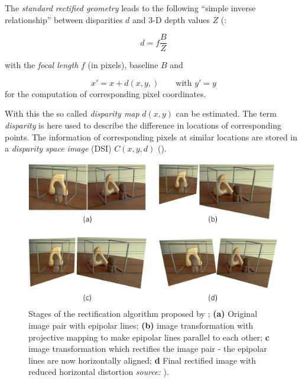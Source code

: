 The \textit{standard rectified geometry} leads to the following \enquote{simple inverse relationship} between disparities $d$ and 3-D depth values $Z$ (\cite[p.473]{Szeliski.2011}:

\begin{equation}
 d = f \frac{B}{Z} \label{eq:disparity}
\end{equation}

with the \textit{focal length} $f$ (in pixels), baseline $B$ and 

\begin{equation}
 x'=x+d(x,y,) 
 \qquad
 \text{with }
 y'=y
\end{equation}
for the computation of corresponding pixel coordinates.

With this the so called \textit{disparity map} $d(x,y)$ can be estimated. The term \textit{disparity} is here used to describe the difference in locations of corresponding points. The information of corresponding pixels at similar locations are stored in a \textit{disparity space image} (DSI) $C(x,y,d)$ (\cite[p.473]{Szeliski.2011}).

\begin{figure}[htbp]
		\centering
		\includegraphics[width=1.0\textwidth]{figures/Rectify}
		\caption[Stages of the rectification algorithm]{Stages of the rectification algorithm proposed by \cite{Loop.2001}; \textbf{(a)} Original image pair with epipolar lines; \textbf{(b)} image transformation with projective mapping to make epipolar lines parallel to each other; \textbf{c} image transformation which rectifies the image pair - the epipolar lines are now horizontally aligned; \textbf{d} Final rectified image with reduced horizontal distortion    \textit{source:} \cite[p.12]{Loop.2001}).}
		\label{fig:Rectify}
\end{figure} 


